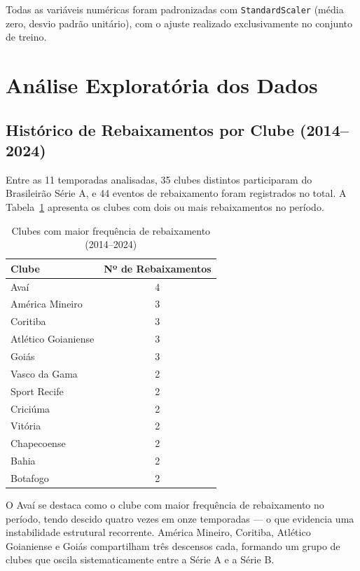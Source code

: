 Todas as variáveis numéricas foram padronizadas com \texttt{StandardScaler}
(média zero, desvio padrão unitário), com o ajuste realizado exclusivamente no conjunto de treino.


\section{Análise Exploratória dos Dados}

\subsection{Histórico de Rebaixamentos por Clube (2014--2024)}

Entre as 11 temporadas analisadas, 35 clubes distintos participaram do Brasileirão Série A,
e 44 eventos de rebaixamento foram registrados no total.
A Tabela~\ref{tab:historico_reb} apresenta os clubes com dois ou mais rebaixamentos no período.

\begin{table}[H]
\centering
\caption{Clubes com maior frequência de rebaixamento (2014--2024)}
\label{tab:historico_reb}
\begin{tabular}{lc}
\toprule
\textbf{Clube} & \textbf{Nº de Rebaixamentos} \\
\midrule
Avaí                & 4 \\
América Mineiro     & 3 \\
Coritiba            & 3 \\
Atlético Goianiense & 3 \\
Goiás               & 3 \\
Vasco da Gama       & 2 \\
Sport Recife        & 2 \\
Criciúma            & 2 \\
Vitória             & 2 \\
Chapecoense         & 2 \\
Bahia               & 2 \\
Botafogo            & 2 \\
\bottomrule
\end{tabular}
\end{table}

O Avaí se destaca como o clube com maior frequência de rebaixamento no período,
tendo descido quatro vezes em onze temporadas — o que evidencia uma instabilidade estrutural
recorrente. América Mineiro, Coritiba, Atlético Goianiense e Goiás compartilham
três descensos cada, formando um grupo de clubes que oscila sistematicamente
entre a Série A e a Série B.


